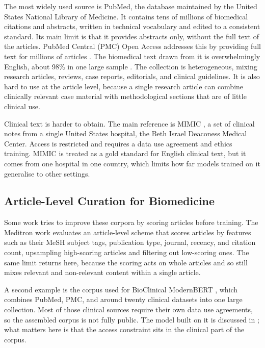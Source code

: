 The most widely used source is PubMed, the database maintained by the United States National
Library of Medicine. It contains tens of millions of biomedical citations and abstracts,
written in technical vocabulary and edited to a consistent standard. Its main limit is that
it provides abstracts only, without the full text of the articles. PubMed Central (PMC) Open
Access addresses this by providing full text for millions of articles
\citep{chen2023meditron}. The biomedical text drawn from it is overwhelmingly English, about
98\% in one large sample \citep{labrak-etal-2024-biomistral}. The collection is heterogeneous,
mixing research articles, reviews, case reports, editorials, and clinical guidelines. It is
also hard to use at the article level, because a single research article can combine
clinically relevant case material with methodological sections that are of little clinical use.

Clinical text is harder to obtain. The main reference is MIMIC
\citep{johnson2016mimiciii,johnson_mimiciv_2023}, a set of clinical notes from a single
United States hospital, the Beth Israel Deaconess Medical Center. Access is restricted and
requires a data use agreement and ethics training. MIMIC is treated as a gold standard for
English clinical text, but it comes from one hospital in one country, which limits how far
models trained on it generalise to other settings.

\subsection{Article-Level Curation for Biomedicine}

Some work tries to improve these corpora by scoring articles before training. The Meditron
work \citep{chen2023meditron} evaluates an article-level scheme that scores articles by
features such as their MeSH subject tags, publication type, journal, recency, and citation
count, upsampling high-scoring articles and filtering out low-scoring ones. The same limit
returns here, because the scoring acts on whole articles and so still mixes relevant and
non-relevant content within a single article.

A second example is the corpus used for BioClinical ModernBERT
\citep{sounack2025bioclinicalmodernbert}, which combines PubMed, PMC, and around twenty
clinical datasets into one large collection. Most of those clinical sources require their own
data use agreements, so the assembled corpus is not fully public. The model
built on it is discussed in ; what matters here is that the access
constraint sits in the clinical part of the corpus.

